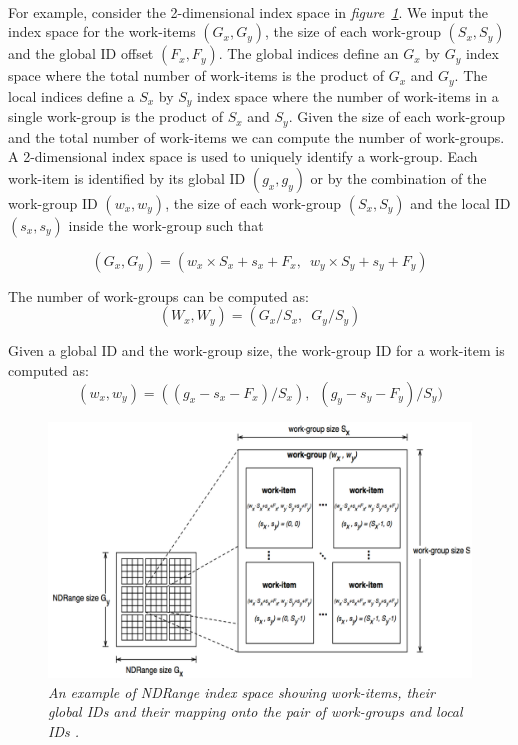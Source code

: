 \paragraph{}
For example, consider the 2-dimensional index space in \textit{figure~\ref{fig:execution_model}}. We input the index space for the work-items $(G_{x}, G_{y})$, the size of each work-group $(S_{x}, S_{y})$ and the global ID offset $(F_{x}, F_{y})$. The global indices define an $G_{x}$ by $G_{y}$ index space where the total number of work-items is the product of $G_{x}$ and $G_{y}$. The local indices define a $S_{x}$ by $S_{y}$ index space where the number of work-items in a single work-group is the product of $S_{x}$ and $S_{y}$.  Given the size of each work-group and the total number of work-items we can compute the number of work-groups. A 2-dimensional index space is used to uniquely identify a work-group. Each work-item is identified by its global ID $(g_{x}, g_{y})$ or by the combination of the work-group ID $(w_{x}, w_{y})$, the size of each work-group $(S_{x}, S_{y})$ and the local ID $(s_{x}, s_{y})$ inside the work-group such that 

\begin{equation}
(G_{x}, G_{y}) = (w_{x} \times{S_{x}} + {s_{x}} + {F_{x}},\;\ w_{y} \times{S_{y}} + {s_{y}} + {F_{y}})
\end{equation}

The number of work-groups can be computed as: 
\begin{equation}
(W_{x}, W_{y}) = (G_{x} / S_{x},\;\ G_{y} / S_{y})
\end{equation}

Given a global ID and the work-group size, the work-group ID for a work-item is computed as: 
\begin{equation}
(w_{x}, w_{y}) = ((g_{x} - s_{x} - F_{x}) / S_{x}),\;\ (g_{y} - s_{y} - F_{y}) / S_{y})%
\end{equation}  
  
\begin{figure}[ht]
\centerline{\includegraphics[width=1.0\textwidth]{execution_model.png}}
\caption[Execution model]%
{\textit{An example of NDRange index space showing work-items, their global IDs and their mapping onto the pair of work-groups and local IDs \cite[p.~25]{OpenCL_specifications}.}\label{fig:execution_model}}
\end{figure}

